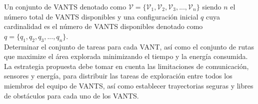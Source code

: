 \documentclass[sigconf]{acmart}
\begin{document}
Un conjunto de VANTS denotado como $\mathcal{V} = \{\mathcal{V}_{1},\mathcal{V}_{2},\mathcal{V}_{3},...,\mathcal{V}_{n}\}$ siendo $n$ el número total de VANTS disponibles y una configuración inicial $q$ cuya cardinalidad es el número de VANTS disponibles denotado como $q = \{q_{1},q_{2},q_{3},...,q_{n}\}$.\\

Determinar el conjunto de tareas para cada VANT, así como el conjunto de rutas que maximize el área explorada minimizando el tiempo y la energía consumida.\\


La estrategia propuesta debe tomar en cuenta las limitaciones de comunicación, sensores y energía, para distribuir las tareas de exploración entre todos los miembros del equipo de VANTS, así como establecer trayectorias seguras y libres de obstáculos para cada uno de los VANTS.\\


%
%
%
\end{document}
